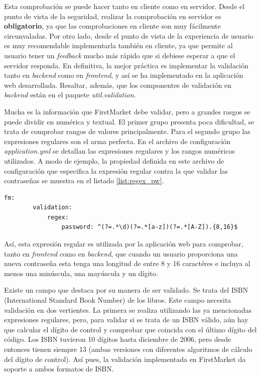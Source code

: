 \documentclass[a4paper]{article}
\begin{document}
	Esta comprobación se puede hacer tanto en cliente como en servidor. Desde el punto de vista de la seguridad, realizar la comprobación en servidor es \textbf{obligatorio}, ya que las comprobaciones en cliente son muy fácilmente circunvaladas. Por otro lado, desde el punto de vista de la experiencia de usuario es muy recomendable implementarla también en cliente, ya que permite al usuario tener un \emph{feedback} mucho más rápido que si debiese esperar a que el servidor responda. En definitiva, la mejor práctica es implementar la validación tanto en \emph{backend} como en \emph{frontend}, y así se ha implementado en la aplicación web desarrollada. Resaltar, además, que los componentes de validación en \emph{backend} están en el paquete \emph{util.validation}.
	
	Mucha es la información que FirstMarket debe validar, pero a grandes rasgos se puede dividir en numérica y textual. El primer grupo presenta poca dificultad, se trata de comprobar rangos de valores principalmente. Para el segundo grupo las expresiones regulares son el arma perfecta. En el archivo de configuración \emph{application.yml} se detallan las expresiones regulares y los rangos numéricos utilizados. A modo de ejemplo, la propiedad definida en este archivo de configuración que especifica la expresión regular contra la que validar las contraseñas se muestra en el listado \ref{list:regex_pw}.
	\\
	
	\begin{lstlisting}[caption=Expresión regular para las contraseñas,label=list:regex_pw]
	fm:
		validation:
			regex:
				password: ^(?=.*\d)(?=.*[a-z])(?=.*[A-Z]).{8,16}$
	\end{lstlisting}
	
	Así, esta expresión regular es utilizada por la aplicación web para comprobar, tanto en \emph{frontend} como en \emph{backend}, que cuando un usuario proporciona una nueva contraseña esta tenga una longitud de entre 8 y 16 caractéres e incluya al menos una minúscula, una mayúscula y un dígito.
	
	Existe un campo que destaca por su manera de ser validado. Se trata del ISBN (International Standard Book Number) de los libros. Este campo necesita validación en dos vertientes. La primera se realiza utilizando las ya mencionadas expresiones regulares, pero, para validar si se trata de un ISBN válido, aún hay que calcular el dígito de control y comprobar que coincida con el último dígito del código. Los ISBN tuvieron 10 dígitos hasta diciembre de 2006, pero desde entonces tienen siempre 13 (ambas versiones con diferentes algoritmos de cálculo del dígito de control). Así pues, la validación implementada en FirstMarket da soporte a ambos formatos de ISBN.
	
\end{document}
